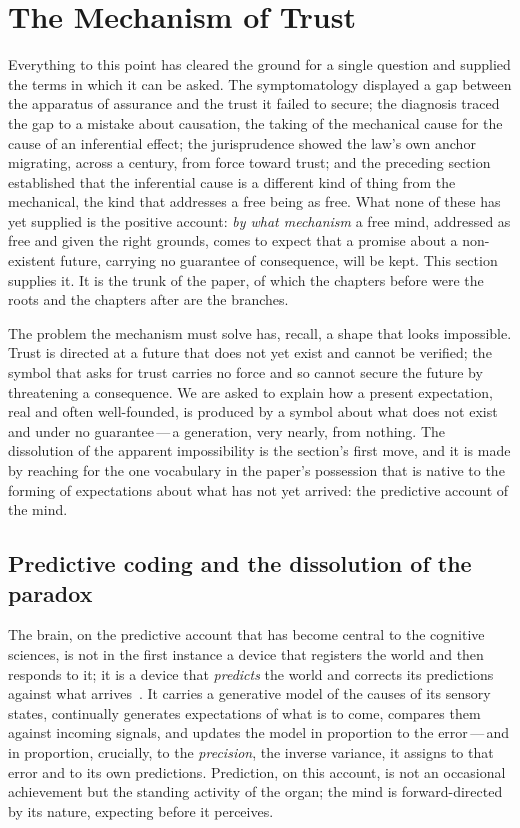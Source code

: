 \section{The Mechanism of Trust}
\label{p13:sec:mechanism}

\noindent
Everything to this point has cleared the ground for a single question and supplied the terms in which it can be asked. The symptomatology displayed a gap between the apparatus of assurance and the trust it failed to secure; the diagnosis traced the gap to a mistake about causation, the taking of the mechanical cause for the cause of an inferential effect; the jurisprudence showed the law's own anchor migrating, across a century, from force toward trust; and the preceding section established that the inferential cause is a different kind of thing from the mechanical, the kind that addresses a free being as free. What none of these has yet supplied is the positive account: \emph{by what mechanism} a free mind, addressed as free and given the right grounds, comes to expect that a promise about a non-existent future, carrying no guarantee of consequence, will be kept. This section supplies it. It is the trunk of the paper, of which the chapters before were the roots and the chapters after are the branches.

The problem the mechanism must solve has, recall, a shape that looks impossible. Trust is directed at a future that does not yet exist and cannot be verified; the symbol that asks for trust carries no force and so cannot secure the future by threatening a consequence. We are asked to explain how a present expectation, real and often well-founded, is produced by a symbol about what does not exist and under no guarantee\,---\,a generation, very nearly, from nothing. The dissolution of the apparent impossibility is the section's first move, and it is made by reaching for the one vocabulary in the paper's possession that is native to the forming of expectations about what has not yet arrived: the predictive account of the mind.

\subsection{Predictive coding and the dissolution of the paradox}
\label{p13:sub:mech-pc}

The brain, on the predictive account that has become central to the cognitive sciences, is not in the first instance a device that registers the world and then responds to it; it is a device that \emph{predicts} the world and corrects its predictions against what arrives~\parencite{friston2010,clark2013,hohwy2013}. It carries a generative model of the causes of its sensory states, continually generates expectations of what is to come, compares them against incoming signals, and updates the model in proportion to the error\,---\,and in proportion, crucially, to the \emph{precision}, the inverse variance, it assigns to that error and to its own predictions. Prediction, on this account, is not an occasional achievement but the standing activity of the organ; the mind is forward-directed by its nature, expecting before it perceives.


